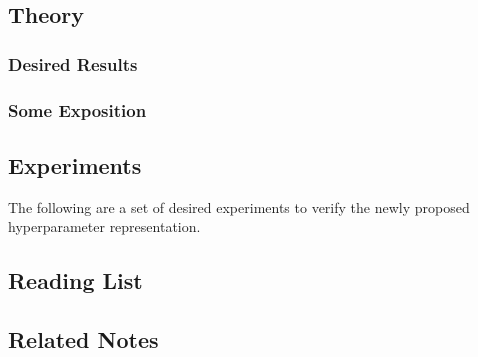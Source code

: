 \documentclass[12pt]{article}
\begin{document}
\subsection{Theory}

\subsubsection{Desired Results}

\subsubsection{Some Exposition}

\subsection{Experiments}

The following are a set of desired experiments to verify the newly proposed hyperparameter representation.

\subsection{Reading List}

\subsection{Related Notes}
\end{document}
